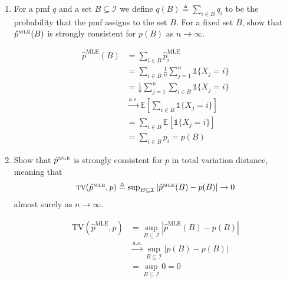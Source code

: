 \documentclass[11pt]{report}
\newcommand{\ind}{{\mathds{1}}}
\newcommand{\teq}{\triangleq}
\newcommand{\E}{\mathbb{E}}
\newcommand{\abs}[1]{\left\lvert#1\right\rvert}
\begin{document}
\begin{enumerate}[1.]
\begin{enumerate}
                    \color{black}


              \item For a pmf $q$ and a set $B\subseteq \mathcal{I}$ we define $q(B)\teq \sum_{i\in B}q_i$ to be the probability that the pmf assigns to the set $B$. For a fixed set $B$, show that $\hat p^{\text{\tiny MLE}}(B)$ is strongly consistent for $p(B)$ as $n\to\infty$.

                    \color{blue}
                    \begin{align*}
                        \hat p^{\text{MLE}}(B) & = \sum_{i \in B} \hat p_i^{\text{MLE}}                                        \\
                                               & = \sum_{i \in B} \frac{1}{n}\sum_{j=1}^{n} \ind\{X_j = i\}                    \\
                                               & = \frac{1}{n}\sum_{j=1}^{n} \sum_{i \in B} \ind\{X_j = i\}                    \\
                                               & \overset{a.s.}{\longrightarrow} \E\left[\sum_{i \in B} \ind\{X_j = i\}\right] \\
                                               & = \sum_{i \in B} \E[\ind\{X_j = i\}]                                          \\
                                               & = \sum_{i \in B} p_i = p(B)
                    \end{align*}
                    \color{black}


              \item Show that $\hat p^{\text{\tiny MLE}}$ is strongly consistent for $p$ in total variation distance, meaning that
                    \[ \textstyle \text{\sc tv}(\hat p^{\text{\tiny MLE}},p) \teq \sup_{B\subseteq\mathcal{I}} |\hat p^{\text{\tiny MLE}}(B)-p(B)| \to 0 \]
                    almost surely as $n\to\infty$.

                    \color{blue}
                    \begin{align*}
                        \text{TV}(\hat p^{\text{MLE}}, p) & = \sup_{B \subseteq \mathcal I} \abs{\hat p^{\text{MLE}}(B) - p(B)}            \\
                                                          & \overset{a.s.}{\longrightarrow} \sup_{B \subseteq \mathcal I} \abs{p(B)- p(B)} \\
                                                          & = \sup_{B \subseteq \mathcal I} 0 = 0
                    \end{align*}
                    \color{black}
          \end{enumerate}







\end{enumerate}
\end{document}
